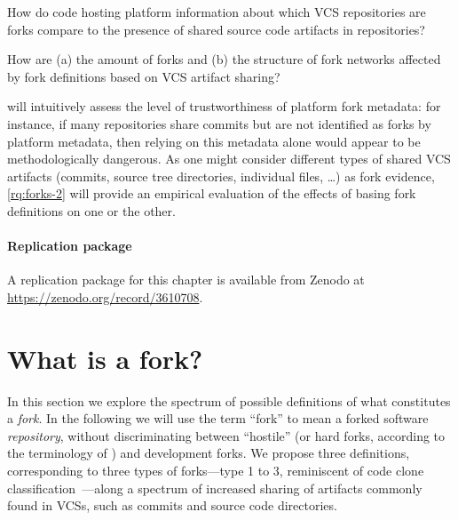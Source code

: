 \begin{researchquestion}%
\label{rq:forks-1}
How do code hosting platform information about which \gls{VCS} repositories are
forks compare to the presence of shared source code artifacts in repositories?
\end{researchquestion}

\begin{researchquestion}%
\label{rq:forks-2}
How are (a) the amount of forks and (b) the structure of fork networks affected
by fork definitions based on \gls{VCS} artifact sharing?
\end{researchquestion}

 will intuitively assess the level of trustworthiness of platform fork
metadata: for instance, if many repositories share commits but are not
identified as forks by platform metadata, then relying on this metadata alone
would appear to be methodologically dangerous. As one might consider different
types of shared \gls{VCS} artifacts (commits, source tree directories, individual
files, \ldots) as fork evidence, \cref{rq:forks-2} will provide an empirical
evaluation of the effects of basing fork definitions on one or the other.


\paragraph{Replication package}
A replication package for this chapter is available from Zenodo at
\url{https://zenodo.org/record/3610708}.


\section{What is a fork?}%
\label{sec:forks-defs}

In this section we explore the spectrum of possible definitions of what
constitutes a \emph{fork}. In the following we will use the term ``fork'' to
mean a forked software \emph{repository}, without discriminating between
``hostile'' (or hard forks, according to the terminology
of \textcite{zhou2019fork}) and development forks. We propose three definitions,
corresponding to three types of forks---type 1 to 3, reminiscent of code clone
classification~\cite{roy2007clonedetectionsurvey,
  rattan2013clonedetectionreview}---along a spectrum of increased sharing of
artifacts commonly found in \glspl{VCS}, such as commits and
source code directories.


